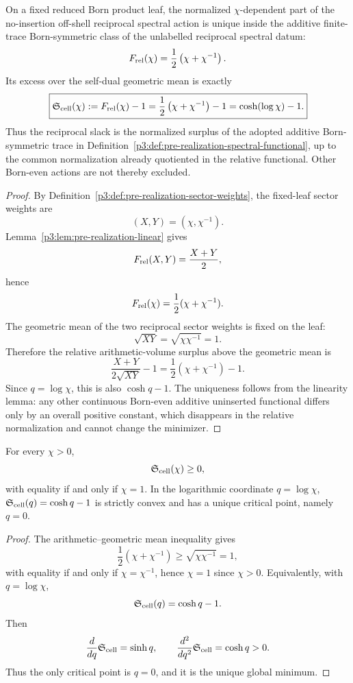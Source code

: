 \documentclass[12pt,a4paper]{article}
\begin{document}
\begin{theorem}
\label{p3:thm:slack-from-spectral-action}
On a fixed reduced Born product leaf, the normalized \(\chi\)-dependent part of the no-insertion
off-shell reciprocal spectral action is unique inside the additive finite-trace
Born-symmetric class of the unlabelled reciprocal spectral datum:
\[
        F_{\rm rel}(\chi)
        =\frac12\left(\chi+\chi^{-1}\right).
\]
Its excess over the self-dual geometric mean is exactly
\[
\boxed{
\mathfrak S_{\rm cell}(\chi)
:=F_{\rm rel}(\chi)-1
=\frac12\left(\chi+\chi^{-1}\right)-1
=\cosh(\log\chi)-1.
}
\]
Thus the reciprocal slack is the normalized surplus of the adopted additive
Born-symmetric trace in
Definition~\ref{p3:def:pre-realization-spectral-functional}, up to the common
normalization already quotiented in the relative functional.  Other
Born-even actions are not thereby excluded.
\end{theorem}

\begin{proof}
By Definition~\ref{p3:def:pre-realization-sector-weights}, the fixed-leaf
sector weights are
\[
  (X,Y)=(\chi,\chi^{-1}).
\]
Lemma~\ref{p3:lem:pre-realization-linear} gives
\[
        F_{\rm rel}(X,Y)=\frac{X+Y}{2},
\]
hence
\[
        F_{\rm rel}(\chi)=\frac12(\chi+\chi^{-1}).
\]
The geometric mean of the two reciprocal sector weights is fixed on the leaf:
\[
        \sqrt{XY}=\sqrt{\chi\chi^{-1}}=1.
\]
Therefore the relative arithmetic-volume surplus above the geometric mean is
\[
        \frac{X+Y}{2\sqrt{XY}}-1
        =\frac12(\chi+\chi^{-1})-1.
\]
Since \(q=\log\chi\), this is also \(\cosh q-1\).  The uniqueness follows from
the linearity lemma: any other continuous Born-even additive uninserted
functional differs only by an overall positive constant, which disappears in
the relative normalization and cannot change the minimizer.
\end{proof}


\begin{lemma}
\label{p3:lem:slack-positive-convex}
For every \(\chi>0\),
\[
\mathfrak S_{\rm cell}(\chi)\ge 0,
\]
with equality if and only if \(\chi=1\).  In the logarithmic coordinate \(q=\log\chi\),
\(\mathfrak S_{\rm cell}(q)=\cosh q-1\) is strictly convex and has a unique critical point,
namely \(q=0\).
\end{lemma}

\begin{proof}
The arithmetic--geometric mean inequality gives
\[
\frac12\left(\chi+\chi^{-1}\right)
\ge
\sqrt{\chi\chi^{-1}}=1,
\]
with equality if and only if \(\chi=\chi^{-1}\), hence \(\chi=1\) since \(\chi>0\).
Equivalently, with \(q=\log\chi\),
\[
\mathfrak S_{\rm cell}(q)=\cosh q-1.
\]
Then
\[
\frac{d}{dq}\mathfrak S_{\rm cell}=\sinh q,
\qquad
\frac{d^2}{dq^2}\mathfrak S_{\rm cell}=\cosh q>0.
\]
Thus the only critical point is \(q=0\), and it is the unique global minimum.
\end{proof}
\end{document}
